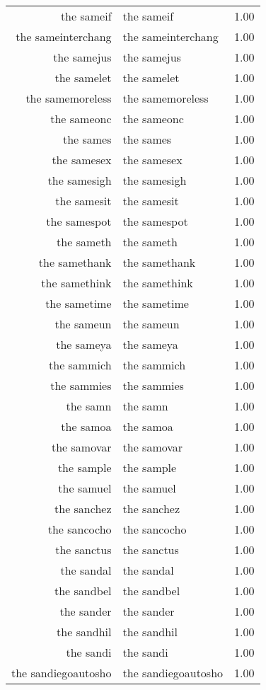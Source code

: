 \begin{table}[ht]
\begin{tabular}{rlr}
  the sameif & the sameif & 1.00 \\ 
  the sameinterchang & the sameinterchang & 1.00 \\ 
  the samejus & the samejus & 1.00 \\ 
  the samelet & the samelet & 1.00 \\ 
  the samemoreless & the samemoreless & 1.00 \\ 
  the sameonc & the sameonc & 1.00 \\ 
  the sames & the sames & 1.00 \\ 
  the samesex & the samesex & 1.00 \\ 
  the samesigh & the samesigh & 1.00 \\ 
  the samesit & the samesit & 1.00 \\ 
  the samespot & the samespot & 1.00 \\ 
  the sameth & the sameth & 1.00 \\ 
  the samethank & the samethank & 1.00 \\ 
  the samethink & the samethink & 1.00 \\ 
  the sametime & the sametime & 1.00 \\ 
  the sameun & the sameun & 1.00 \\ 
  the sameya & the sameya & 1.00 \\ 
  the sammich & the sammich & 1.00 \\ 
  the sammies & the sammies & 1.00 \\ 
  the samn & the samn & 1.00 \\ 
  the samoa & the samoa & 1.00 \\ 
  the samovar & the samovar & 1.00 \\ 
  the sample & the sample & 1.00 \\ 
  the samuel & the samuel & 1.00 \\ 
  the sanchez & the sanchez & 1.00 \\ 
  the sancocho & the sancocho & 1.00 \\ 
  the sanctus & the sanctus & 1.00 \\ 
  the sandal & the sandal & 1.00 \\ 
  the sandbel & the sandbel & 1.00 \\ 
  the sander & the sander & 1.00 \\ 
  the sandhil & the sandhil & 1.00 \\ 
  the sandi & the sandi & 1.00 \\ 
  the sandiegoautosho & the sandiegoautosho & 1.00 \\ 

\end{tabular}
\end{table}
